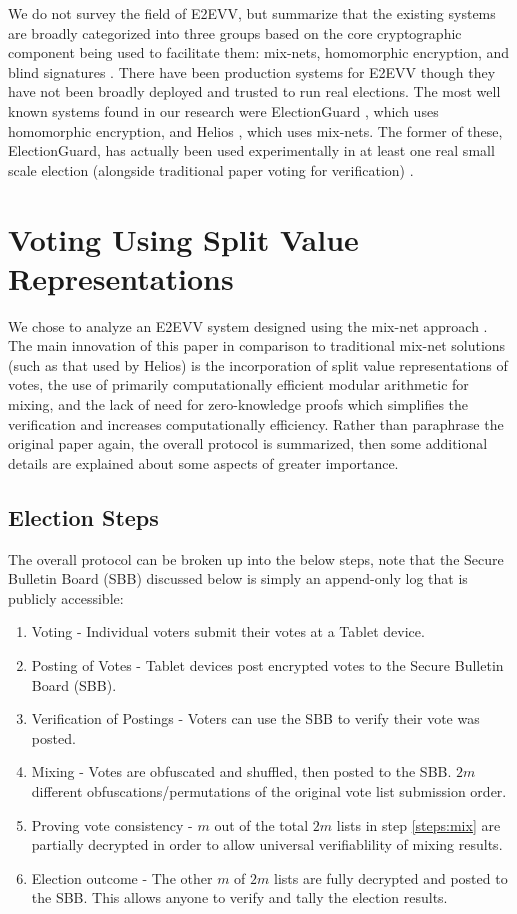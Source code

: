 \documentclass{article}
\begin{document}
We do not survey the field of E2EVV, but summarize that the existing systems are broadly categorized into three groups based on the core cryptographic component being used to facilitate them: mix-nets, homomorphic encryption, and blind signatures \cite{mit}. There have been production systems for E2EVV though they have not been broadly deployed and trusted to run real elections. The most well known systems found in our research were ElectionGuard \cite{election_guard}\cite{eg_github}, which uses homomorphic encryption, and Helios \cite{helios}, which uses mix-nets. The former of these, ElectionGuard, has actually been used experimentally in at least one real small scale election (alongside traditional paper voting for verification) \cite{newyorker}.

\section{Voting Using Split Value Representations}
We chose to analyze an E2EVV system designed using the mix-net approach \cite{svr_vote}. The main innovation of this paper in comparison to traditional mix-net solutions (such as that used by Helios) is the incorporation of split value representations of votes, the use of primarily computationally efficient modular arithmetic for mixing, and the lack of need for zero-knowledge proofs which simplifies the verification and increases computationally efficiency. Rather than paraphrase the original paper again, the overall protocol is summarized, then some additional details are explained about some aspects of greater importance.

\subsection{Election Steps}
The overall protocol can be broken up into the below steps, note that the Secure Bulletin Board (SBB) discussed below is simply an append-only log that is publicly accessible:
\begin{enumerate}
\item
    Voting - Individual voters submit their votes at a Tablet device.
\item
    Posting of Votes - Tablet devices post encrypted votes to the Secure Bulletin Board (SBB).
\item
    Verification of Postings - Voters can use the SBB to verify their vote was posted.
\item \label{steps:mix}
    Mixing - Votes are obfuscated and shuffled, then posted to the SBB. $2m$ different obfuscations/permutations of the original vote list submission order.
\item \label{steps:proof}
    Proving vote consistency - $m$ out of the total $2m$ lists in step \ref{steps:mix} are partially decrypted in order to allow universal verifiablility of mixing results.
\item \label{steps:outcome}
    Election outcome - The other $m$ of $2m$ lists are fully decrypted and posted to the SBB. This allows anyone to verify and tally the election results.
\end{enumerate}
\end{document}
